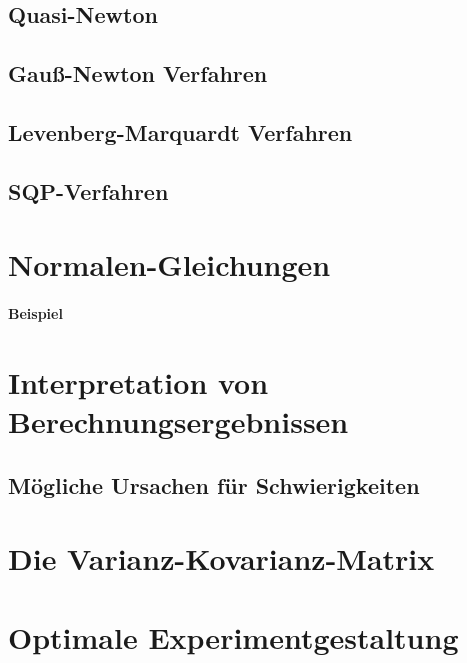		\subsection{Quasi-Newton} %

		\subsection{Gauß-Newton Verfahren} %

		\subsection{Levenberg-Marquardt Verfahren} %

		\subsection{SQP-Verfahren} %

	\section{Normalen-Gleichungen} %

		\paragraph{Beispiel} %

	\section{Interpretation von Berechnungsergebnissen} %

		\subsection{Mögliche Ursachen für Schwierigkeiten} %

	\section{Die Varianz-Kovarianz-Matrix} %

	\section{Optimale Experimentgestaltung} %

